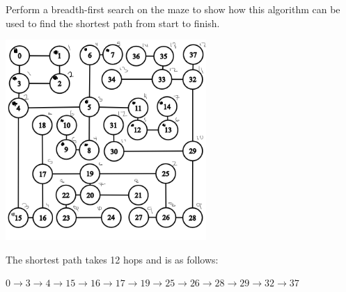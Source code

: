 \documentclass[12pt]{article}
\begin{document}
\pagebreak
\begin{flushleft}
   Perform a breadth-first search on the maze to show how this algorithm can be used to find the shortest path from start to finish.
\end{flushleft}
\begin{center}
   \includegraphics[width=3in]{./graph-annotated.png}
\end{center}
The shortest path takes 12 hops and is as follows:

$0 \to 3 \to 4 \to 15 \to 16 \to 17 \to 19 \to 25 \to 26 \to 28 \to 29 \to 32 \to 37$
\end{document}
